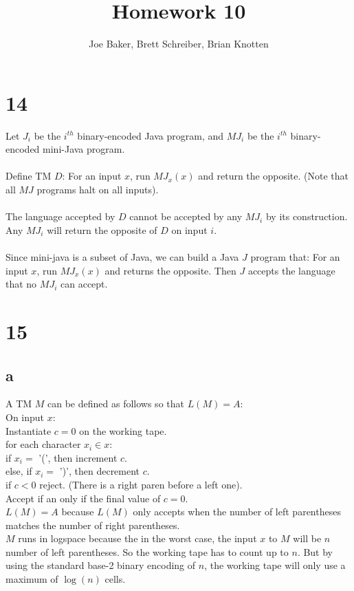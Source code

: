 \documentclass[letterpaper,notitlepage,twoside]{article}
\newcommand\tab[1][1cm]{\hspace*{#1}} %
\begin{document}
\title{Homework 10}
\author{Joe Baker, Brett Schreiber, Brian Knotten}
\maketitle

\section*{14}
Let $J_i$ be the $i^{th}$ binary-encoded Java program, and $MJ_i$ be the $i^{th}$ binary-encoded mini-Java program.
\\\\
Define TM $D$:
For an input $x$, run $MJ_x(x)$ and return the opposite. (Note that all $MJ$ programs halt on all inputs).
\\\\
The language accepted by $D$ cannot be accepted by any $MJ_i$ by its construction. Any $MJ_i$ will return the opposite of $D$ on input $i$.
\\\\
Since mini-java is a subset of Java, we can build a Java $J$ program that: For an input $x$, run $MJ_x(x)$ and returns the opposite. Then $J$ accepts the language that no $MJ_i$ can accept.


\section*{15}
\subsection*{a}
A TM $M$ can be defined as follows so that $L(M) = A$: \\
On input $x$: \\
\tab Instantiate $c = 0$ on the working tape. \\
\tab for each character $x_i \in x$: \\
\tab\tab if $x_i =$ '(', then increment $c$. \\
\tab\tab else, if $x_i =$ ')', then decrement $c$. \\
\tab\tab if $c < 0$ reject. (There is a right paren before a left one). \\
\tab Accept if an only if the final value of $c = 0$. \\
$L(M) = A$ because $L(M)$ only accepts when the number of left parentheses matches the number of right parentheses. \\
$M$ runs in logspace because the in the worst case, the input $x$ to $M$ will be $n$ number of left parentheses. So the working tape has to count up to $n$. But by using the standard base-2 binary encoding of $n$, the working tape will only use a maximum of $\log(n)$ cells. \\
\end{document}
